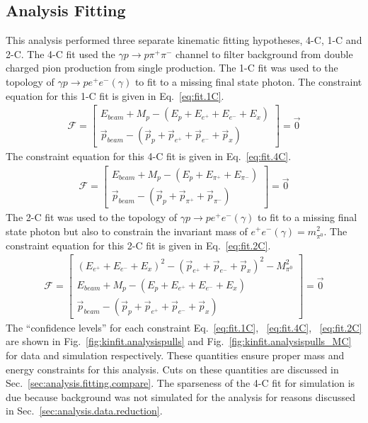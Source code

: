 \subsection{Analysis Fitting}\label{sec:analysis.fitting.topology}
This analysis performed three separate kinematic fitting hypotheses, 4-C, 1-C and 2-C. The 4-C fit used the $\gamma p \to p \pi^+ \pi^-$ channel to filter background from double charged pion production from single \piz production. The 1-C fit was used to the topology of $\gamma p \rightarrow p e^+e^-(\gamma)$ to fit to a missing final state photon. The constraint equation for this 1-C fit is given in Eq.~\ref{eq:fit.1C}.
\begin{align}\label{eq:fit.1C}
\mathcal{F} =\left[\begin{array}{c}
E_{beam}+M_p-(E_p+E_{e^+} + E_{e^-} + E_{x}) \\[3pt]
\vec{p}_{beam} - (\vec{p}_{p} +\vec{p}_{e^+} + \vec{p}_{e^-} + \vec{p}_{x})
\end{array}\right]=\vec{0}
\end{align}
The constraint equation for this 4-C fit is given in Eq.~\ref{eq:fit.4C}.
\begin{align}\label{eq:fit.4C}
\mathcal{F} =\left[\begin{array}{c}
E_{beam}+M_p-(E_p+E_{\pi^+} + E_{\pi^-}) \\[3pt]
\vec{p}_{beam} - (\vec{p}_{p} +\vec{p}_{\pi^+} + \vec{p}_{\pi^-})
\end{array}\right]=\vec{0}
\end{align}
The 2-C fit was used to the topology of $\gamma p \rightarrow p e^+e^-(\gamma)$ to fit to a missing final state photon but also to constrain the invariant mass of $e^+e^-(\gamma) = m_{\pi^0}^2$. The constraint equation for this 2-C fit is given in Eq.~\ref{eq:fit.2C}.
\begin{align}\label{eq:fit.2C}
\mathcal{F} =\left[\begin{array}{c}
(E_{e^+} + E_{e^-} + E_{x})^2 - (\vec{p}_{e^+} + \vec{p}_{e^-} + \vec{p}_{x})^2 - M_{\pi^0}^2 \\[3pt]
E_{beam}+M_p-(E_p+E_{e^+} + E_{e^-} + E_{x}) \\[3pt]
\vec{p}_{beam} - (\vec{p}_{p} +\vec{p}_{e^+} + \vec{p}_{e^-} + \vec{p}_{x})
\end{array}\right]=\vec{0}
\end{align}
The ``confidence levels'' for each constraint Eq.~\ref{eq:fit.1C}, ~\ref{eq:fit.4C}, ~\ref{eq:fit.2C} are shown in Fig.~\ref{fig:kinfit.analysispulls} and Fig.~\ref{fig:kinfit.analysispulls_MC} for  data and simulation respectively. These quantities ensure proper mass and energy constraints for this analysis. Cuts on these quantities are discussed in Sec.~\ref{sec:analysis.fitting.compare}. The sparseness of the 4-C fit for simulation is due because background was not simulated for the analysis for reasons discussed in Sec.~\ref{sec:analysis.data.reduction}.
